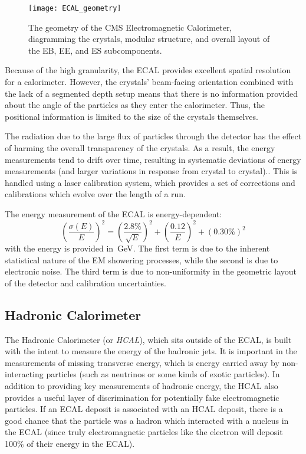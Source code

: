 \begin{figure}[h]
\centering
\texttt{[image: ECAL\_geometry]}
\caption[The geometry of the CMS electromagnetic calorimeter.]{The geometry of the CMS Electromagnetic Calorimeter, diagramming the
crystals, modular structure, and overall layout of the EB, EE, and ES
subcomponents.}
\label{fig:ECAL_geometry}
\end{figure}

Because of the high granularity, the ECAL provides excellent spatial resolution
for a calorimeter. However, the crystals' beam-facing orientation combined with
the lack of a segmented depth setup means that there is no information provided
about the angle of the particles as they enter the calorimeter. Thus, the
positional information is limited to the size of the crystals themselves.

The radiation due to the large flux of particles through the detector has the
effect of harming the overall transparency of the crystals. As a result, the
energy measurements tend to drift over time, resulting in systematic deviations
of energy measurements (and larger variations in response from crystal to
crystal).. This is handled using a laser calibration system, which provides a
set of corrections and calibrations which evolve over the length of a run.

The energy measurement of the ECAL is energy-dependent:
\begin{equation}
    \left(\frac{\sigma(E)}{E}\right)^2 =
        \left(\frac{2.8\%}{\sqrt{E}}\right)^2+\left(\frac{0.12}{E}\right)^2+\left(0.30\%\right)^2
\end{equation}
with the energy is provided in~GeV.  The first term is due to the inherent
statistical nature of the EM showering processes, while the second is due to
electronic noise. The third term is due to non-uniformity in the geometric
layout of the detector and calibration uncertainties.

\subsection{Hadronic Calorimeter} 
The Hadronic Calorimeter (or \emph{HCAL}), which sits outside of the ECAL, is
built with the intent to measure the energy of the hadronic jets. It is
important in the measurements of missing transverse energy, which is energy
carried away by non-interacting particles (such as neutrinos or some kinds of
exotic particles). In addition to providing key measurements of hadronic energy,
the HCAL also provides a useful layer of discrimination for potentially fake
electromagnetic particles. If an ECAL deposit is associated with an HCAL
deposit, there is a good chance that the particle was a hadron which interacted
with a nucleus in the ECAL (since truly electromagnetic particles like the
electron will deposit 100\% of their energy in the ECAL).

